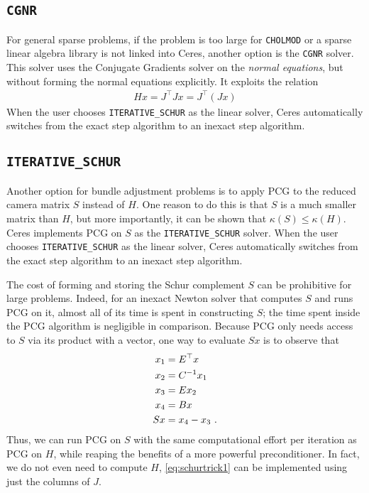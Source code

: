 \subsection{\texttt{CGNR}}
For general sparse problems, if the problem is too large for \texttt{CHOLMOD} or a sparse linear algebra library is not linked into Ceres, another option is the \texttt{CGNR} solver. This solver uses the Conjugate Gradients solver on the {\em normal equations}, but without forming the normal equations explicitly. It exploits the relation
\begin{align}
    H x = J^\top J x = J^\top(J x)
\end{align}
When the user chooses \texttt{ITERATIVE\_SCHUR} as the linear solver, Ceres automatically switches from the exact step algorithm to an inexact step algorithm.



\subsection{\texttt{ITERATIVE\_SCHUR}}
Another option for bundle adjustment problems is to apply PCG to the reduced camera matrix $S$ instead of $H$. One reason to do this is that $S$ is a much smaller matrix than $H$, but more importantly, it can be shown that $\kappa(S)\leq \kappa(H)$.  Ceres implements PCG on $S$ as the \texttt{ITERATIVE\_SCHUR} solver. When the user chooses \texttt{ITERATIVE\_SCHUR} as the linear solver, Ceres automatically switches from the exact step algorithm to an inexact step algorithm.

The cost of forming and storing the Schur complement $S$ can be prohibitive for large problems. Indeed, for an inexact Newton solver that computes $S$ and runs PCG on it, almost all of its time is spent in constructing $S$; the time spent inside the PCG algorithm is negligible in comparison. Because  PCG only needs access to $S$ via its product with a vector, one way to evaluate $Sx$ is to observe that
\begin{align}
  x_1 &= E^\top x \notag \\
  x_2 &= C^{-1} x_1 \notag\\
  x_3 &= Ex_2 \notag\\
  x_4 &= Bx \notag\\
  Sx &= x_4 - x_3\ .\label{eq:schurtrick1}
\end{align}
Thus, we can run PCG on $S$ with the same computational effort per iteration as PCG on $H$, while reaping the benefits of a more powerful preconditioner. In fact, we do not even need to compute $H$, \eqref{eq:schurtrick1} can be implemented using just the columns of $J$.

